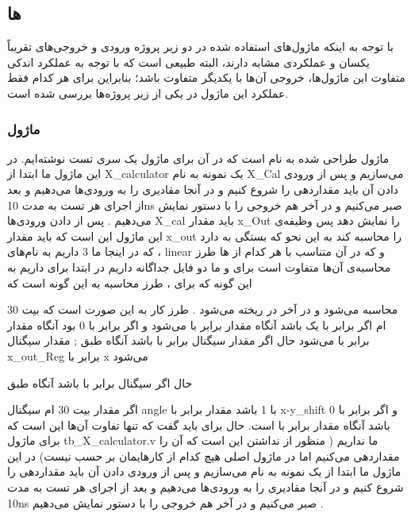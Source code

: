 \documentclass[12pt,titlepage,a4page , tikz , multi,table , svgnames,xcdraw]{article}
\begin{document}
\newpage


\subsection{  ها}

با توجه به اینکه ماژول‌های استفاده شده در دو زیر پروژه ورودی و خروجی‌های تقریباً یکسان و عملکردی مشابه دارند، البته طبیعی است که با توجه به عملکرد اندکی متفاوت این ماژول‌ها، خروجی آن‌ها با یکدیگر متفاوت باشد؛ بنابراین برای هر کدام فقط عملکرد این ماژول در یکی از زیر پروژه‌ها بررسی شده است.


\subsubsection{ماژول }


ماژول طراحی شده  به نام    است که در آن برای ماژول   یک سری تست نوشته‌ایم. در این ماژول ما ابتدا از X\_calculator  یک نمونه به نام X\_Cal  می‌سازیم و پس از ورودی دادن آن باید مقداردهی را شروع کنیم و در آنجا مقادیری را به ورودی‌ها می‌دهیم و بعد از اجرای هر تست به مدت 10ns  صبر می‌کنیم و در آخر هم خروجی را با  دستور   نمایش می‌دهیم . پس از  دادن ورودی‌ها X\_cal  باید مقدار x\_Out  را نمایش دهد پس وظیفه‌ی این ماژول این است که باید مقدار x\_out  را محاسبه کند به این نحو که بستگی به   دارد که در اینجا ما 3   داریم به نام‌های  ، linear   و  که در آن متناسب با هر کدام از   ها طرز محاسبه‌ی آن‌ها متفاوت است برای   و    ما دو فایل جداگانه داریم در ابتدا برای   داریم  به این گونه که  برای   ، طرز محاسبه به این گونه است که



 محاسبه می‌شود و در آخر در   ریخته می‌شود . طرز کار به این صورت است که بیت 30 ام   اگر برابر با یک باشد آنگاه مقدار   برابر با   می‌شود و اگر برابر با 0 بود  آنگاه مقدار   برابر با   می‌شود
حال اگر مقدار سیگنال   برابر با   باشد آنگاه طبق ; مقدار سیگنال x\_out\_Reg  برابر با x می‌شود

حال اگر سیگنال  برابر با   باشد آنگاه طبق


 
 اگر مقدار  بیت 30 ام سیگنال angle   با 1 باشد مقدار  برابر با x-y\_shift  و اگر برابر با 0 باشد آنگاه مقدار   برابر با   است.
حال برای   باید گفت که تنها تفاوت آن‌ها این است که برای ماژول tb\_X\_calculator.v  ما   نداریم ( منظور از نداشتن این است که آن را مقداردهی می‌کنیم اما در ماژول اصلی هیچ کدام از کارهایمان بر حسب   نیست) در این ماژول ما ابتدا از  یک نمونه به نام   می‌سازیم و پس از ورودی دادن آن باید مقداردهی را شروع کنیم و در آنجا مقادیری را به ورودی‌ها می‌دهیم و بعد از اجرای هر تست به مدت 10ns  صبر می‌کنیم و در آخر هم خروجی را با  دستور   نمایش می‌دهیم .
\end{document}
